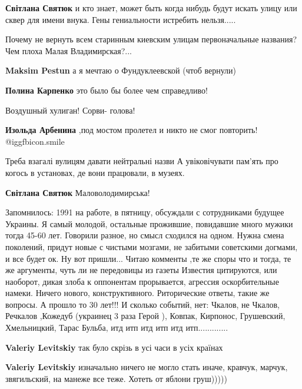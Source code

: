 \begin{itemize}
\begin{itemize}
\textbf{Світлана Святюк} и кто знает, может быть когда нибудь будут искать улицу или сквер для имени внука. Гены гениальности истребить нельзя.....
\end{itemize} %


Почему не вернуть всем старинным киевским улицам первоначальные названия? Чем
плоха Малая Владимирская?...

\begin{itemize} %
\textbf{Maksim Pestun} а я мечтаю о Фундуклеевской (чтоб вернули)

\textbf{Полина Карпенко} это было бы более чем справедливо!
\end{itemize} %

Воздушный хулиган! Сорви- голова!

\textbf{Изольда Арбенина} ,под мостом пролетел и никто не смог повторить!  @igg{fbicon.smile} 


Треба взагалі вулицям давати нейтральні назви А увіковічувати пам'ять про
когось в установах, де вони працювали, в музеях.

\textbf{Світлана Святюк}
Маловолодимирська!


Запомнилось: 1991 на работе, в пятницу, обсуждали с сотрудниками будущее
Украины. Я самый молодой, остальные прожившие, повидавшие много мужики тогда
45-60 лет. Говорили разное, но смысл сходился на одном. Нужна смена поколений,
придут новые с чистыми мозгами, не забитыми советскими догмами, и все будет ок.
Ну вот пришли... Читаю комменты ,те же споры что и тогда, те же аргументы, чуть
ли не передовицы из газеты Известия цитируются, или наоборот, дикая злоба к
оппонентам прорывается, агрессия оскорбительные намеки. Ничего нового,
конструктивного. Риторические ответы, такие же вопросы. А прошло то 30 лет!!! И
сколько событий, нет: Чкалов, не Чкалов, Речкалов ,Кожедуб (украинец 3 раза
Герой ), Ковпак, Кирпонос, Грушевский, Хмельницкий, Тарас Бульба, итд итп итд
итп итд итп.............

\begin{itemize} %
\textbf{Valeriy Levitskiy} так було скрізь в усі часи в усіх країнах

\textbf{Valeriy Levitskiy} изначально ничего не могло стать иначе, кравчук, марчук, звягильский, на манеже все теже. Хотеть от яблони груш)))))


\end{itemize}
\end{itemize}
